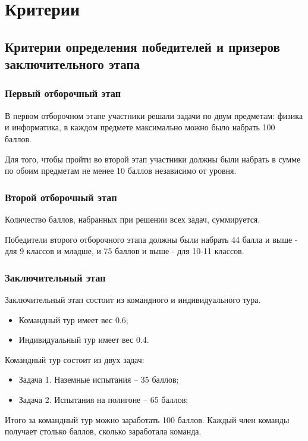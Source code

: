 \part{Критерии}
\chapter{Критерии определения победителей и призеров заключительного этапа}

\section{Первый отборочный этап}
 
В первом отборочном этапе участники решали задачи по двум предметам: физика и информатика, в каждом предмете максимально можно было набрать 100 баллов.

Для того, чтобы пройти во второй этап участники должны были набрать в сумме по обоим предметам не менее 10 баллов независимо от уровня.

\section{Второй отборочный этап}

Количество баллов, набранных при решении всех задач, суммируется.

Победители второго отборочного этапа должны были набрать 44 балла и выше - для 9 классов и младше, и 75 баллов и выше - для 10-11 классов.

\section{Заключительный этап}

Заключительный этап состоит из командного и индивидуального тура.
\begin{itemize}
    \item Командный тур имеет вес 0.6;
    \item Индивидуальный тур имеет вес 0.4.
\end{itemize}

Командный тур состоит из двух задач:
\begin{itemize}
    \item Задача 1. Наземные испытания – 35 баллов;
    \item Задача 2. Испытания на полигоне – 65 баллов;
\end{itemize}

Итого за командный тур можно заработать 100 баллов. Каждый член команды получает столько баллов, сколько заработала команда.

